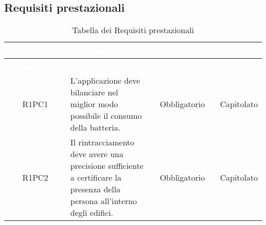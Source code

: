 \subsection{Requisiti prestazionali}
{
\renewcommand{\arraystretch}{1.5}
\centering
\begin{longtable}{ c C{8cm} c c}
\caption{Tabella dei Requisiti prestazionali}\\
\textcolor{white}{\textbf{Identificativo}} & \textcolor{white}{\textbf{Descrizione}} & \textcolor{white}{\textbf{Classificazione}} & \textcolor{white}{\textbf{Fonti}}\\	
\endfirsthead
{}
\textcolor{white}{\textbf{Identificativo}} & \textcolor{white}{\textbf{Descrizione}} & \textcolor{white}{\textbf{Classificazione}} & \textcolor{white}{\textbf{Fonti}}\\
\endhead

R1PC1 & L'applicazione deve bilanciare nel miglior modo possibile il consumo della batteria. & Obbligatorio & Capitolato\\

R1PC2 & Il rintracciamento deve avere una precisione sufficiente a certificare la presenza della persona all'interno degli edifici. & Obbligatorio & Capitolato\\

\end{longtable}
}